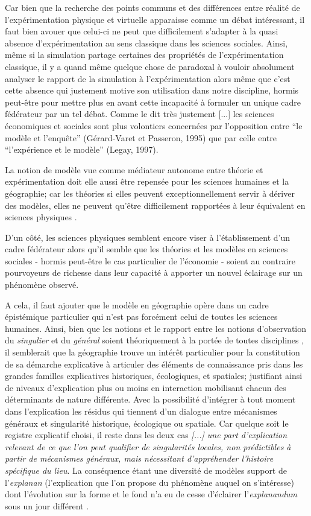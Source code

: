 Car bien que la recherche des points communs et des différences entre réalité de l'expérimentation physique et virtuelle apparaisse comme un débat intéressant, il faut bien avouer que celui-ci ne peut que difficilement s'adapter à la quasi absence d'expérimentation au sens classique dans les sciences sociales. Ainsi, même si la simulation partage certaines des propriétés de l'expérimentation classique, il y a quand même quelque chose de paradoxal à vouloir absolument analyser le rapport de la simulation à l'expérimentation alors même que c'est cette absence qui justement motive son utilisation dans notre discipline, hormis peut-être pour mettre plus en avant cette incapacité à formuler un unique cadre fédérateur par un tel débat. Comme le dit très justement \textcite{Phan2008} {[...] les sciences économiques et sociales sont plus volontiers concernées par l’opposition entre \enquote{le modèle et l’enquête}  (Gérard-Varet et Passeron, 1995) que par celle entre \enquote{l’expérience et le modèle} (Legay, 1997)}.

La notion de modèle vue comme médiateur autonome entre théorie et expérimentation doit elle aussi être repensée pour les sciences humaines et la géographie; car les théories si elles peuvent exceptionnellement servir à dériver des modèles, elles ne peuvent qu'être difficilement rapportées à leur équivalent en sciences physiques \autocite{Pumain1997}.

D'un côté, les sciences physiques semblent encore viser à l'établissement d'un cadre fédérateur alors qu'il semble que les théories et les modèles en sciences sociales - hormis peut-être le cas particulier de l'économie - soient au contraire pourvoyeurs de richesse dans leur capacité à apporter un nouvel éclairage sur un phénomène observé.

A cela, il faut ajouter que le modèle en géographie opère dans un cadre épistémique particulier qui n'est pas forcément celui de toutes les sciences humaines. Ainsi, bien que les notions et le rapport entre les notions d'observation du \textit{singulier} et du \textit{général} soient théoriquement à la portée de toutes disciplines \autocite{Dastes1992}, il semblerait que la géographie trouve un intérêt particulier pour la constitution de sa démarche explicative à articuler des éléments de connaissance pris dans les grandes familles explicatives historiques, écologiques, et spatiales; justifiant ainsi de niveaux d'explication plus ou moins en interaction mobilisant chacun des déterminants de nature différente. Avec la possibilité d'intégrer à tout moment dans l'explication les résidus qui tiennent d'un dialogue entre mécanismes généraux et singularité historique, écologique ou spatiale. Car quelque soit le registre explicatif choisi, il reste dans les deux cas \textit{ [...] une part d'explication relevant de ce que l'on peut qualifier de singularités locales, non prédictibles à partir de mécanismes généraux, mais nécessitant d'appréhender l'histoire spécifique du lieu}. La conséquence étant une diversité de modèles support de l'\textit{explanan} (l’explication que l’on propose du phénomène auquel on s’intéresse) dont l'évolution sur la forme et le fond n'a eu de cesse d'éclairer l'\textit{explanandum} sous un jour différent \autocite{Dastes1992, Sanders2000, Sanders2013}.

